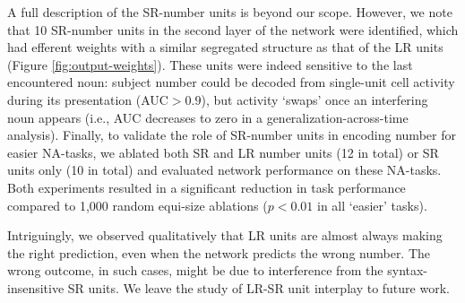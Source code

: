 A full description of the SR-number units is beyond our scope. However, we note that 10 SR-number units in the second layer of the
network were identified, which had efferent weights with a similar segregated
structure as that of the LR units (Figure
\ref{fig:output-weights}). These units were indeed sensitive to the last
encountered noun: subject number could be decoded from single-unit cell activity
during its presentation (AUC$>0.9$), but activity `swaps' once an
interfering noun appears (i.e., AUC decreases to zero in a
generalization-across-time analysis). Finally, to validate the role of SR-number units in encoding number for easier NA-tasks, we ablated both SR and LR number
units (12 in total) or SR units only (10 in total) and evaluated network performance on these NA-tasks. Both experiments resulted in a significant reduction in task performance compared to 1,000 random equi-size ablations ($p<0.01$ in all `easier' tasks).

Intriguingly, we observed qualitatively that LR units are almost
always making the right prediction, even when the network predicts the
wrong number. The wrong outcome, in such cases, might be due to
interference from the syntax-insensitive SR units. We leave the study of LR-SR
unit interplay to future work.

